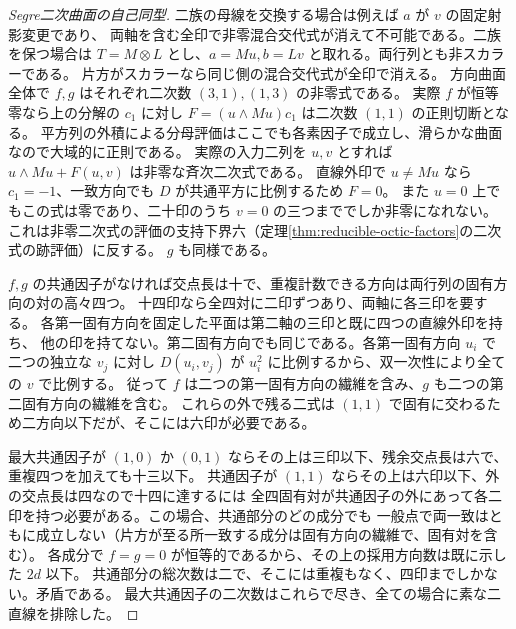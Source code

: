 \begin{proof}[Segre二次曲面の自己同型]
二族の母線を交換する場合は例えば $a$ が $v$ の固定射影変更であり、
両軸を含む全印で非零混合交代式が消えて不可能である。二族を保つ場合は
$T=M\otimes L$ とし、$a=Mu,b=Lv$ と取れる。両行列とも非スカラーである。
片方がスカラーなら同じ側の混合交代式が全印で消える。
方向曲面全体で $f,g$ はそれぞれ二次数 $(3,1),(1,3)$ の非零式である。
実際 $f$ が恒等零なら上の分解の $c_1$ に対し $F=(u\wedge Mu)c_1$ は二次数 $(1,1)$ の正則切断となる。
平方列の外積による分母評価はここでも各素因子で成立し、滑らかな曲面なので大域的に正則である。
実際の入力二列を $u,v$ とすれば $u\wedge Mu+F(u,v)$ は非零な斉次二次式である。
直線外印で $u\ne Mu$ なら $c_1=-1$、一致方向でも $D$ が共通平方に比例するため $F=0$。
また $u=0$ 上でもこの式は零であり、二十印のうち $v=0$ の三つまででしか非零になれない。
これは非零二次式の評価の支持下界六（定理\ref{thm:reducible-octic-factors}の二次式の跡評価）に反する。
$g$ も同様である。

$f,g$ の共通因子がなければ交点長は十で、重複計数できる方向は両行列の固有方向の対の高々四つ。
十四印なら全四対に二印ずつあり、両軸に各三印を要する。
各第一固有方向を固定した平面は第二軸の三印と既に四つの直線外印を持ち、
他の印を持てない。第二固有方向でも同じである。各第一固有方向 $u_i$ で
二つの独立な $v_j$ に対し $D(u_i,v_j)$ が $u_i^2$ に比例するから、双一次性により全ての $v$ で比例する。
従って $f$ は二つの第一固有方向の繊維を含み、$g$ も二つの第二固有方向の繊維を含む。
これらの外で残る二式は $(1,1)$ で固有に交わるため二方向以下だが、そこには六印が必要である。

最大共通因子が $(1,0)$ か $(0,1)$ ならその上は三印以下、残余交点長は六で、重複四つを加えても十三以下。
共通因子が $(1,1)$ ならその上は六印以下、外の交点長は四なので十四に達するには
全四固有対が共通因子の外にあって各二印を持つ必要がある。この場合、共通部分のどの成分でも
一般点で両一致はともに成立しない（片方が至る所一致する成分は固有方向の繊維で、固有対を含む）。
各成分で $f=g=0$ が恒等的であるから、その上の採用方向数は既に示した $2d$ 以下。
共通部分の総次数は二で、そこには重複もなく、四印までしかない。矛盾である。
最大共通因子の二次数はこれらで尽き、全ての場合に素な二直線を排除した。
\end{proof}
